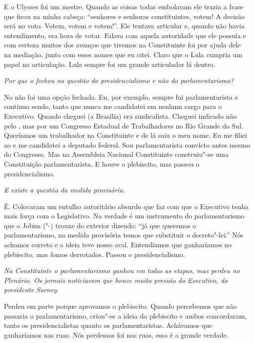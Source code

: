E o Ulysses foi um mestre. Quando as coisas todas embolavam ele trazia a
frase que ficou na minha cabeça: ``senhores e senhoras constituintes,
votem! A decisão será no voto. Votem, votem e votem!''. Ele tentava
articular e, quando não havia entendimento, era hora de votar. Falava
com aquela autoridade que ele possuía e com certeza muitos dos avanços
que tivemos na Constituinte foi por ajuda dele na mediação, junto com
esses nomes que eu citei. Claro que o Lula cumpria um papel na
articulação. Lula sempre foi um grande articulador lá dentro.

\medskip

\noindent\emph{Por que o  fechou na questão do presidencialismo e não do
parlamentarismo?}

No  não foi uma opção fechada. Eu, por exemplo, sempre
fui parlamentarista e continuo sendo, tanto que nunca me candidatei em
nenhum cargo para o Executivo. Quando cheguei (a Brasília) era
sindicalista. Cheguei indicado não pelo , mas por um Congresso
Estadual de Trabalhadores no Rio Grande do Sul. Queríamos um trabalhador
na Constituinte e de lá saiu o meu nome. Eu me filiei ao  e me
candidatei a deputado federal. Sou parlamentarista convicto antes mesmo
do Congresso. Mas na Assembleia Nacional Constituinte construiu"-se uma
Constituição parlamentarista. E houve o plebiscito, mas passou o
presidencialismo.

\medskip

\noindent\emph{E existe a questão da medida provisória.}

É. Colocaram um entulho autoritário absurdo que faz com
que o Executivo tenha mais força com o Legislativo. Na verdade é um
instrumento do parlamentarismo que o Jobim ("-) trouxe do exterior
dizendo: ``já que queremos o parlamentarismo, na medida provisória temos
que substituir o decreto"-lei.'' Nós achamos correto e a ideia teve nosso
aval. Entendíamos que ganharíamos no plebiscito, mas fomos derrotados.
Passou o presidencialismo.

\medskip

\noindent\emph{Na Constituinte o parlamentarismo ganhou em todas as etapas, mas
perdeu no Plenário. Os jornais noticiavam que houve muita pressão do
Executivo, do presidente Sarney.}

Perdeu em parte porque aprovamos o plebiscito. Quando
percebemos que não passaria o parlamentarismo, criou"-se a ideia do
plebiscito e ambos concordaram, tanto os presidencialistas quanto os
parlamentaristas. Achávamos que ganharíamos nas ruas. Nós perdemos foi
nas ruas, essa é a grande verdade.

